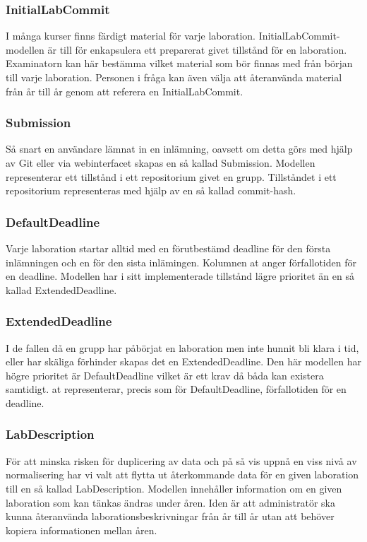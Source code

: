 \subsubsection{InitialLabCommit}
I många kurser finns färdigt material för varje laboration. InitialLabCommit-modellen är till för enkapsulera ett preparerat givet tillstånd för en laboration. Examinatorn kan här bestämma vilket material som bör finnas med från början till varje laboration. Personen i fråga kan även välja att återanvända material från år till år genom att referera en InitialLabCommit.

\subsubsection{Submission}
Så snart en användare lämnat in en inlämning, oavsett om detta görs med hjälp av Git eller via webinterfacet skapas en så kallad Submission. Modellen representerar ett tillstånd i ett repositorium givet en grupp. Tillståndet i ett repositorium representeras med hjälp av en så kallad commit-hash.

\subsubsection{DefaultDeadline}
Varje laboration startar alltid med en förutbestämd deadline för den första inlämningen och en för den sista inlämingen. Kolumnen at anger förfallotiden för en deadline. Modellen har i sitt implementerade tillstånd lägre prioritet än en så kallad  ExtendedDeadline.

\subsubsection{ExtendedDeadline}
I de fallen då en grupp har påbörjat en laboration men inte hunnit bli klara i tid, eller har skäliga förhinder skapas det en ExtendedDeadline. Den här modellen har högre prioritet är DefaultDeadline vilket är ett krav då båda kan existera samtidigt. at representerar, precis som för DefaultDeadline, förfallotiden för en deadline.

\subsubsection{LabDescription}
För att minska risken för duplicering av data och på så vis uppnå en viss nivå av normalisering har vi valt att flytta ut återkommande data för en given laboration till en så kallad LabDescription. Modellen innehåller information om en given laboration som kan tänkas ändras under åren. Iden är att administratör ska kunna återanvända laborationsbeskrivningar från år till år utan att behöver kopiera informationen mellan åren.

